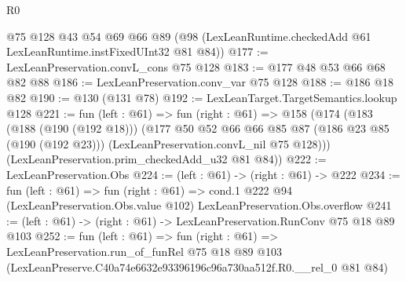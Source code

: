 \begin{lexlean}{R0}
\begin{coremodule}
    @75
    @128
    @43
    @54
    @69
    @66
    @89
    (@98 (LexLeanRuntime.checkedAdd @61 LexLeanRuntime.instFixedUInt32 @81 @84))
@177 := LexLeanPreservation.convL_cons @75 @128
@183 := @177 @48 @53 @66 @68 @82 @88
@186 := LexLeanPreservation.conv_var @75 @128
@188 := @186 @18 @82
@190 := @130 (@131 @78)
@192 := LexLeanTarget.TargetSemantics.lookup @128
@221 := fun (left : @61) =>
  fun (right : @61) =>
  @158
    (@174
      (@183
        (@188 (@190 (@192 @18)))
        (@177
          @50
          @52
          @66
          @66
          @85
          @87
          (@186 @23 @85 (@190 (@192 @23)))
          (LexLeanPreservation.convL_nil @75 @128)))
      (LexLeanPreservation.prim_checkedAdd_u32 @81 @84))
@222 := LexLeanPreservation.Obs
@224 := (left : @61) -> (right : @61) -> @222
@234 := fun (left : @61) =>
  fun (right : @61) =>
  cond.{1} @222 @94 (LexLeanPreservation.Obs.value @102) LexLeanPreservation.Obs.overflow
@241 := (left : @61) -> (right : @61) -> LexLeanPreservation.RunConv @75 @18 @89 @103
@252 := fun (left : @61) =>
  fun (right : @61) =>
  LexLeanPreservation.run_of_funRel
    @75
    @18
    @89
    @103
    (LexLeanPreserve.C40a74e6632e93396196c96a730aa512f.R0.__rel_0 @81 @84)
\end{coremodule}
\end{lexlean}
